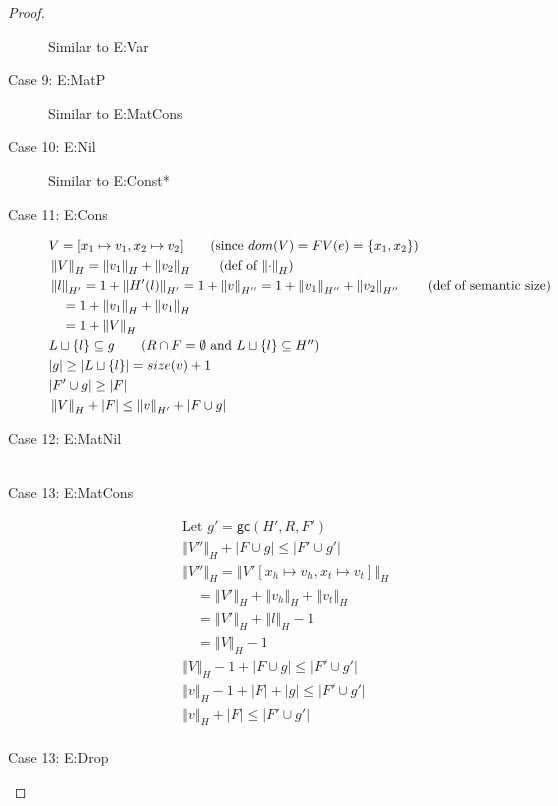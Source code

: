 \documentclass[sigconf]{acmart}
\newcommand{\ssize}[2]{\left\Vert #2 \right\Vert_{#1}}
\newcommand{\gc}[3]{\mathsf{gc}(#1,#2,#3)}
\theoremstyle{definition}
\begin{document}
\begin{proof}
\begin{description}
  Similar to E:Var
  \item[Case 9: E:MatP]
  Similar to E:MatCons
  \item[Case 10: E:Nil]
  Similar to E:Const*
  \item[Case 11: E:Cons]
  \begin{align*}
  &V = [x_1 \mapsto v_1,x_2 \mapsto v_2] \tag{since $dom(V) = FV(e) = \{x_1,x_2\}$}\\
  &\ssize{H}{V} = \ssize{H}{v_1} + \ssize{H}{v_2} \tag{def of $\ssize{H}{\cdot}$}\\
  &\ssize{H'}{l} = 1 + \ssize{H'}{H'(l)} = 1 + \ssize{H''}{v} = 1 + \ssize{H''}{v_1} + \ssize{H''}{v_2}
  \tag{def of semantic size}\\
  &\quad = 1 + \ssize{H}{v_1} + \ssize{H}{v_1}\\
  &\quad = 1 + \ssize{H}{V}\\
  &L \sqcup \{l\} \subseteq g \tag{$R \cap F = \emptyset$ and $L \sqcup \{l\} \subseteq H''$}\\
  &|g| \ge |L \sqcup \{l\}| = size(v) + 1\\
  &|F' \cup g| \ge |F|\\
  &\ssize{H}{V} + |F| \le \ssize{H'}{v} + |F \cup g|\\
  \end{align*}
  \item[Case 12: E:MatNil]
  \begin{align*}
  \end{align*}
  \item [Case 13: E:MatCons]
  \begin{align*}
  &\text{Let } g' = \gc{H'}{R}{F'}\\
  &\ssize{H}{V''}  + |F \cup g| \le |F' \cup g'| \tag{IH (wfc from main lemma)}\\
  &\ssize{H}{V''} = \ssize{H}{V'[x_h \mapsto v_h, x_t \mapsto v_t]}\\
  &\quad = \ssize{H}{V'} + \ssize{H}{v_h} + \ssize{H}{v_t}\\
  &\quad = \ssize{H}{V'} + \ssize{H}{l} - 1\\
  &\quad = \ssize{H}{V} - 1\\
  &\ssize{H}{V} - 1 + |F \cup g| \le |F' \cup g'|\\
  &\ssize{H}{v} - 1 + |F| + |g| \le |F' \cup g'| \tag{$F \cap g = \emptyset$}\\
  &\ssize{H}{v} + |F| \le |F' \cup g'| \tag{$|g| \ge 1$ from main lemma}\\
  \end{align*}
  \item [Case 13: E:Drop]

\end{description}
\end{proof}
\end{document}
